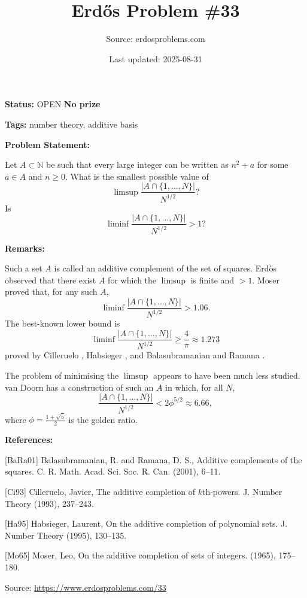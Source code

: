 \documentclass{article}
\title{Erd\H{o}s Problem \#33}
\date{Last updated: 2025-08-31}
\author{Source: erdosproblems.com}
\begin{document}
\maketitle

\noindent\textbf{Status:} OPEN \quad \textbf{No prize}

\noindent\textbf{Tags:} number theory, additive basis

\medskip
\noindent\textbf{Problem Statement:}

Let $A\subset\mathbb{N}$ be such that every large integer can be written as $n^2+a$ for some $a\in A$ and $n\geq 0$. What is the smallest possible value of\[\limsup \frac{\lvert A\cap\{1,\ldots,N\}\rvert}{N^{1/2}}?\]Is\[\liminf \frac{\lvert A\cap\{1,\ldots,N\}\rvert}{N^{1/2}}>1?\]

\bigskip
\noindent\textbf{Remarks:}

Such a set $A$ is called an additive complement of the set of squares. Erd\H{o}s observed that there exist $A$ for which the $\limsup$ is finite and $>1$. Moser \cite{Mo65} proved that, for any such $A$,\[\liminf \frac{\lvert A\cap\{1,\ldots,N\}\rvert}{N^{1/2}}>1.06.\]The best-known lower bound is\[\liminf \frac{\lvert A\cap\{1,\ldots,N\}\rvert}{N^{1/2}}\geq\frac{4}{\pi}\approx 1.273\]proved by Cilleruelo \cite{Ci93}, Habsieger \cite{Ha95}, and Balasubramanian and Ramana \cite{BaRa01}.

The problem of minimising the $\limsup$ appears to have been much less studied. van Doorn has a construction of such an $A$ in which, for all $N$,\[\frac{\lvert A\cap\{1,\ldots,N\}\rvert}{N^{1/2}}< 2\phi^{5/2}\approx 6.66,\]where $\phi=\frac{1+\sqrt{5}}{2}$ is the golden ratio.

\bigskip
\noindent\textbf{References:}

[BaRa01] Balasubramanian, R. and Ramana, D. S., Additive complements of the squares. C. R. Math. Acad. Sci. Soc. R. Can. (2001), 6--11.
 
 [Ci93] Cilleruelo, Javier, The additive completion of {$k$}th-powers. J. Number Theory (1993), 237--243.
 
 [Ha95] Habsieger, Laurent, On the additive completion of polynomial sets. J. Number Theory (1995), 130--135.
 
 [Mo65] Moser, Leo, On the additive completion of sets of integers. (1965), 175--180.

\bigskip
\noindent\small{Source: \url{https://www.erdosproblems.com/33}}
\end{document}
